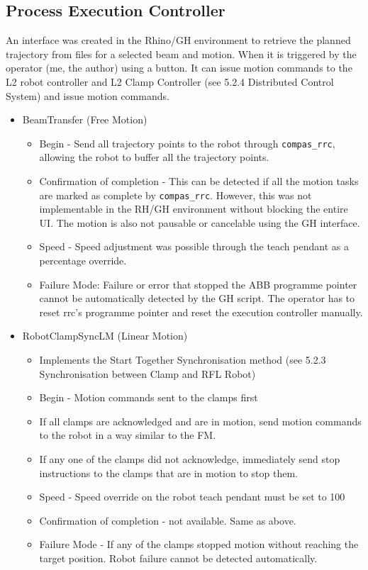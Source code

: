 \subsection{Process Execution Controller}
An interface was created in the Rhino/GH environment to retrieve the planned trajectory from files for a selected beam and motion. When it is triggered by the operator (me, the author) using a button. It can issue motion commands to the L2 robot controller and L2 Clamp Controller (see 5.2.4 Distributed Control System) and issue motion commands. 
\begin{itemize}
\item BeamTransfer (Free Motion)
    \begin{itemize}
        \item Begin - Send all trajectory points to the robot through \verb|compas_rrc|, allowing the robot to buffer all the trajectory points. 
        \item Confirmation of completion  -  This can be detected if all the motion tasks are marked as complete by \verb|compas_rrc|. However, this was not implementable in the RH/GH environment without blocking the entire UI. The motion is also not pausable or cancelable using the GH interface.
        \item Speed - Speed adjustment was possible through the teach pendant as a percentage override.
        \item Failure Mode: Failure or error that stopped the ABB programme pointer cannot be automatically detected by the GH script. The operator has to reset rrc’s programme pointer and reset the execution controller manually.
    \end{itemize}
    \item RobotClampSyncLM (Linear Motion)
    \begin{itemize}
        \item Implements the Start Together Synchronisation method (see 5.2.3 Synchronisation between Clamp and RFL Robot)
        \item Begin - Motion commands sent to the clamps first
    \end{itemize}
    \begin{itemize}
        \item If all clamps are acknowledged and are in motion, send motion commands to the robot in a way similar to the FM.
        \item If any one of the clamps did not acknowledge, immediately send stop instructions to the clamps that are in motion to stop them. 
    \end{itemize}
    \begin{itemize}
        \item Speed - Speed override on the robot teach pendant must be set to 100%
        \item Confirmation of completion - not available. Same as above.
        \item Failure Mode - If any of the clamps stopped motion without reaching the target position. Robot failure cannot be detected automatically.
    \end{itemize}
\end{itemize}

